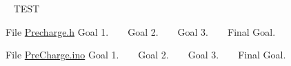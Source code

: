 \begin{DoxyRefList}
 ~\newline
 TEST  
\item[File \mbox{\hyperlink{_precharge_8h}{Precharge.h}} ]\label{todo__todo000009}%
%
 Goal 1. ~\newline
 ~\newline
 Goal 2. ~\newline
 ~\newline
 Goal 3. ~\newline
 ~\newline
 Final Goal.  
\item[File \mbox{\hyperlink{_pre_charge_8ino}{Pre\+Charge.ino}} ]\label{todo__todo000010}%
%
 Goal 1. ~\newline
 ~\newline
 Goal 2. ~\newline
 ~\newline
 Goal 3. ~\newline
 ~\newline
 Final Goal. 
\end{DoxyRefList}